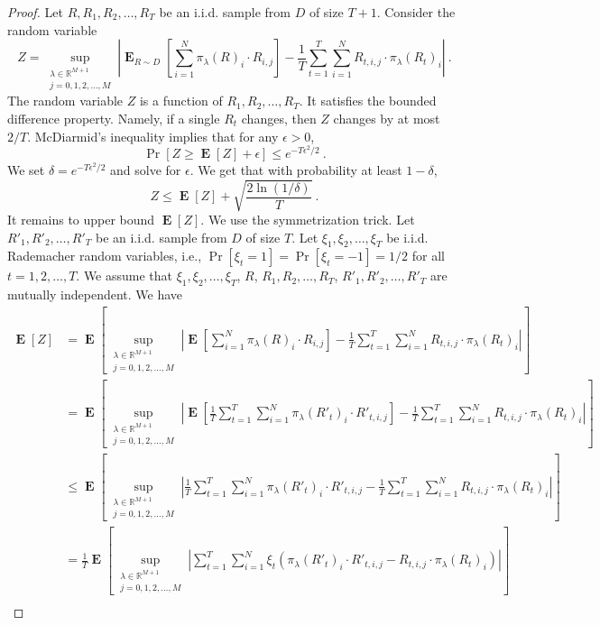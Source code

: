 \documentclass[12pt]{article}
\newcommand{\R}{\mathbb{R}}
\DeclareMathOperator*{\Exp}{\mathbf{E}}
\theoremstyle{definition}
\begin{document}
\begin{proof}
Let $R, R_1, R_2, \dots, R_T$ be an i.i.d. sample from $D$ of size $T+1$.
Consider the random variable
$$
Z = \sup_{\substack{\lambda \in \R^{M+1} \\ j=0,1,2,\dots,M}}
\left| \Exp_{R \sim D} \left[ \sum_{i=1}^N \pi_\lambda(R)_i \cdot R_{i,j}  \right] - \frac{1}{T} \sum_{t=1}^T \sum_{i=1}^N R_{t,i,j} \cdot \pi_\lambda(R_t)_i \right| \: .
$$
The random variable $Z$ is a function of $R_1, R_2, \dots, R_T$. It satisfies
the bounded difference property. Namely, if a single $R_t$ changes, then $Z$
changes by at most $2/T$. McDiarmid's inequality implies that for any $\epsilon > 0$,
$$
\Pr\left[ Z \ge \Exp[Z] + \epsilon \right] \le e^{-T\epsilon^2/2} \: .
$$
We set $\delta = e^{-T\epsilon^2/2}$ and solve for $\epsilon$. We get that with
probability at least $1-\delta$,
$$
Z \le \Exp[Z] + \sqrt{ \frac{2\ln(1/\delta)}{T} } \: .
$$
It remains to upper bound $\Exp[Z]$. We use the symmetrization trick. Let $R'_1,
R'_2, \dots, R'_T$ be an i.i.d. sample from $D$ of size $T$. Let $\xi_1,
\xi_2, \dots, \xi_T$ be i.i.d. Rademacher random variables, i.e.,
$\Pr[\xi_t = 1] = \Pr[\xi_t = -1] = 1/2$ for all $t=1,2,\dots,T$. We
assume that $\xi_1, \xi_2, \dots, \xi_T$, $R$, $R_1, R_2, \dots, R_T$,
$R'_1, R'_2, \dots, R'_T$ are mutually independent. We have
\begin{align*}
\Exp[Z] & = \Exp\left[\sup_{\substack{\lambda \in \R^{M+1} \\ j=0,1,2,\dots,M}} \left| \Exp \left[ \sum_{i=1}^N \pi_\lambda(R)_i \cdot R_{i,j}  \right] - \frac{1}{T} \sum_{t=1}^T \sum_{i=1}^N R_{t,i,j} \cdot \pi_\lambda(R_t)_i \right| \right] \\
& = \Exp\left[\sup_{\substack{\lambda \in \R^{M+1} \\ j=0,1,2,\dots,M}} \left| \Exp \left[ \frac{1}{T} \sum_{t=1}^T \sum_{i=1}^N \pi_\lambda(R'_t)_i \cdot R'_{t,i,j}  \right] - \frac{1}{T} \sum_{t=1}^T \sum_{i=1}^N R_{t,i,j} \cdot \pi_\lambda(R_t)_i \right| \right] \\
& \le \Exp\left[\sup_{\substack{\lambda \in \R^{M+1} \\ j=0,1,2,\dots,M}} \left| \frac{1}{T} \sum_{t=1}^T \sum_{i=1}^N \pi_\lambda(R'_t)_i \cdot R'_{t,i,j} - \frac{1}{T} \sum_{t=1}^T \sum_{i=1}^N R_{t,i,j} \cdot \pi_\lambda(R_t)_i \right| \right] \\
& = \frac{1}{T} \Exp\left[\sup_{\substack{\lambda \in \R^{M+1} \\ j=0,1,2,\dots,M}} \left| \sum_{t=1}^T \sum_{i=1}^N \xi_t \left(\pi_\lambda(R'_t)_i \cdot R'_{t,i,j} - R_{t,i,j} \cdot \pi_\lambda(R_t)_i \right) \right| \right] \\

\end{align*}
\end{proof}
\end{document}
